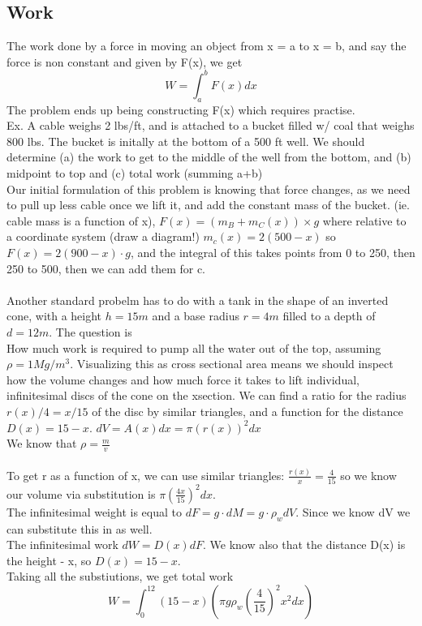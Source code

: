 \documentclass[twocolumn, 12pt]{report}
\begin{document}
\subsection{Work}
The work done by a force in moving an object from x = a to x = b, and say the force is non constant and given by F(x), we get $$W  = \int_a^b F(x)dx$$
The problem ends up being constructing F(x) which requires practise. \\
Ex. A cable weighs 2 lbs/ft, and is attached to a bucket filled w/ coal that weighs 800 lbs. The bucket is initally at the bottom of a 500 ft well. We should determine (a) the work to get to the middle of the well from the bottom, and (b) midpoint to top and (c) total work (summing a+b) \\ Our initial formulation of this problem is knowing that force changes, as we need to pull up less cable once we lift it, and add the constant mass of the bucket. (ie. cable mass is a function of x), $F(x) = (m_B + m_C (x)) \times g $ where relative to a coordinate system (draw a diagram!) $m_c (x) = 2 (500-x)$ so $F(x) = 2(900-x)\cdot g$, and the integral of this takes points from 0 to 250, then 250 to 500, then we can add them for c.\\\\
Another standard probelm has to do with a tank in the shape of an inverted cone, with a height $h = 15m$ and a base radius $r = 4m$ filled to a depth of $d = 12 m$. The question is \\How much work is required to pump all the water out of the top, assuming $\rho = 1 Mg/m^3$. Visualizing this as cross sectional area means we should inspect how the volume changes and how much force it takes to lift individual, infinitesimal discs of the cone on the xsection. We can find a ratio for the radius $r(x)/4 = x/15$ of the disc by similar triangles, and a function for the distance $D(x) = 15 - x$. $dV = A(x)dx = \pi(r(x))^2 dx$\\
We know that $\rho = \frac{m}{v}$\\\\ To get r as a function of x, we can use similar triangles: $\frac{r(x)}{x} = \frac{4}{15}$ so we know our volume via substitution is $\pi (\frac{4x}{15})^2 dx$. \\ The infinitesimal weight is equal to $dF = g\cdot dM = g\cdot \rho_w dV$. Since we know dV we can substitute this in as well.\\ The infinitesimal work $dW = D(x) dF$. We know also that the distance D(x) is the height - x, so $D(x) = 15-x.$\\ Taking all the substiutions, we get total work $$W = \int_0^12 (15-x)(\pi g \rho_w (\frac{4}{15})^2 x^2 dx)$$
\end{document}
